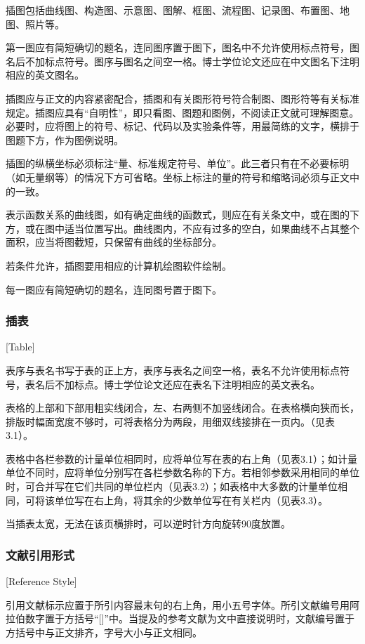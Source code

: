 插图包括曲线图、构造图、示意图、图解、框图、流程图、记录图、布置图、地图、照片等。

第一图应有简短确切的题名，连同图序置于图下，图名中不允许使用标点符号，图名后不加标点符号。图序与图名之间空一格。博士学位论文还应在中文图名下注明相应的英文图名。

插图应与正文的内容紧密配合，插图和有关图形符号符合制图、图形符等有关标准规定。插图应具有“自明性”，即只看图、图题和图例，不阅读正文就可理解图意。必要时，应将图上的符号、标记、代码以及实验条件等，用最简练的文字，横排于图题下方，作为图例说明。

插图的纵横坐标必须标注“量、标准规定符号、单位”。此三者只有在不必要标明（如无量纲等）的情况下方可省略。坐标上标注的量的符号和缩略词必须与正文中的一致。

表示函数关系的曲线图，如有确定曲线的函数式，则应在有关条文中，或在图的下方，或在图中适当位置写出。曲线图内，不应有过多的空白，如果曲线不占其整个面积，应当将图截短，只保留有曲线的坐标部分。

若条件允许，插图要用相应的计算机绘图软件绘制。

每一图应有简短确切的题名，连同图号置于图下。

\subsubsection{插表}[Table]

表序与表名书写于表的正上方，表序与表名之间空一格，表名不允许使用标点符号，表名后不加标点。博士学位论文还应在表名下注明相应的英文表名。

表格的上部和下部用粗实线闭合，左、右两侧不加竖线闭合。在表格横向狭而长，排版时幅面宽度不够时，可将表格分为两段，用细双线接排在一页内。（见表3.1）。

表格中各栏参数的计量单位相同时，应将单位写在表的右上角（见表3.1）；如计量单位不同时，应将单位分别写在各栏参数名称的下方。若相邻参数采用相同的单位时，可合并写在它们共同的单位栏内（见表3.2）；如表格中大多数的计量单位相同，可将该单位写在右上角，将其余的少数单位写在有关栏内（见表3.3）。

当插表太宽，无法在该页横排时，可以逆时针方向旋转90度放置。

\subsubsection{文献引用形式}[Reference Style]

引用文献标示应置于所引内容最末句的右上角，用小五号字体。所引文献编号用阿拉伯数字置于方括号“[]”中。当提及的参考文献为文中直接说明时，文献编号置于方括号中与正文排齐，字号大小与正文相同。

